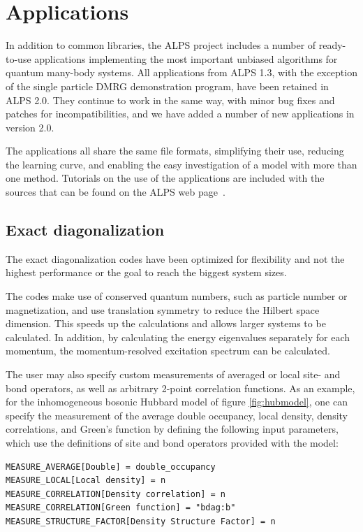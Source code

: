 \documentclass[12pt]{iopart}
\begin{document}
\section{Applications}
\label{sec:applications}
In addition to common libraries, the ALPS project includes a number of ready-to-use applications implementing the most important unbiased
algorithms for quantum many-body systems. All applications from ALPS 1.3, with the exception of the single particle DMRG demonstration program, have been retained in ALPS 2.0. They continue to work in the same way, with minor bug fixes and patches for incompatibilities, and we have added a number of new applications in version 2.0.

The applications all
share the same file formats, simplifying their use, reducing the
learning curve, and enabling the easy investigation of a model with
more than one method. Tutorials on the use of the applications are
included with the sources that can be found on the ALPS web
page~\cite{alps}.

\subsection{Exact diagonalization}

The exact diagonalization codes have been optimized for flexibility and not the highest performance or the goal to reach the biggest system sizes.

The codes make use of conserved quantum numbers, such as particle number or magnetization, and use translation symmetry to reduce the Hilbert space dimension. This speeds up the calculations and allows larger systems to be calculated. In addition, by calculating the energy eigenvalues separately for each momentum, the momentum-resolved excitation spectrum can be calculated.

The user may also specify custom measurements of averaged or local site- and bond operators, as well as arbitrary 2-point correlation functions. As an example, for the inhomogeneous bosonic Hubbard model of figure \ref{fig:hubmodel}, one can specify the measurement of the average double occupancy, local density, density correlations, and Green's function by defining the following input parameters, which use the definitions of site and bond operators provided with the model:

\begin{verbatim}
MEASURE_AVERAGE[Double] = double_occupancy
MEASURE_LOCAL[Local density] = n
MEASURE_CORRELATION[Density correlation] = n
MEASURE_CORRELATION[Green function] = "bdag:b"
MEASURE_STRUCTURE_FACTOR[Density Structure Factor] = n
\end{verbatim}
\end{document}
